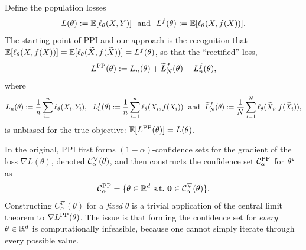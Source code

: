 Define the population losses
\begin{equation*}
  L(\theta) := \mathbb{E}[\ell_\theta(X, Y)]
  ~~ \mbox{and} ~~
  L^f(\theta) := \mathbb{E}[\ell_\theta(X, f(X))].
\end{equation*}
The starting point of PPI and our approach is the recognition that $\mathbb{E}[\ell_\theta(X, f(X))]
= \mathbb{E}[\ell_\theta(\widetilde{X}, f(\widetilde{X}))] = L^f(\theta)$, so that the ``rectified'' loss,
\begin{equation*}
  L^{\mathrm{PP}}(\theta) := L_n(\theta) +
  \widetilde L^f_N(\theta) - L_n^f(\theta),
\end{equation*}
where
\begin{equation*}
 L_n(\theta) := \frac{1}{n} \sum_{i = 1}^n \ell_\theta(X_i, Y_i), ~~ L_n^f(\theta) := \frac{1}{n} \sum_{i = 1}^n \ell_\theta(X_i, f(X_i))
  ~~ \mbox{and} ~~
  \widetilde{L}_N^f(\theta) := \frac{1}{N} \sum_{i = 1}^N \ell_\theta(\widetilde{X}_i,
  f(\widetilde{X}_i)),
\end{equation*}
is unbiased for the true objective: $\mathbb{E}[L^{\mathrm{PP}}(\theta)] = L(\theta)$.

In the original, PPI first forms
$(1-\alpha)$-confidence sets for the gradient of the loss $\nabla L(\theta)$, denoted $\mathcal{C}^{\nabla}_\alpha(\theta)$, 
and then constructs the confidence set $\mathcal{C}^{\mathrm{PP}}_\alpha$ for $\theta^\star$ as
\begin{equation}
  \label{eq:CPP-original}
  \mathcal{C}^{\mathrm{PP}}_\alpha = \{\theta \in \mathbb{R}^d ~ \mbox{s.t.} ~ \mathbf{0}
  \in \mathcal{C}^\nabla_{\alpha}(\theta)\}.
\end{equation}
Constructing $C^\nabla_\alpha(\theta)$ for a \emph{fixed} $\theta$ is a trivial application of the central limit theorem to $\nabla L^{\mathrm{PP}} (\theta)$. 
The issue is that forming the confidence set for \emph{every} $\theta \in \mathbb{R}^d$ is computationally infeasible, because one cannot simply iterate through every possible value.

